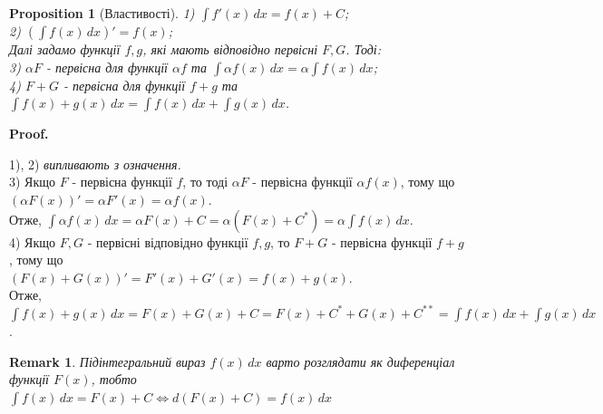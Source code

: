\documentclass[a4paper, 10pt]{article}
\makeatletter
\def\huge{\displaystyle}
\def\qed{$\blacksquare$}
\theoremstyle{theoremdd}
\theoremstyle{theoremdd}
\theoremstyle{theoremdd}
\theoremstyle{theoremdd}
\theoremstyle{theoremdd}
\newtheorem{proposition}[theorem]{Proposition}
\theoremstyle{theoremdd}
\newtheorem{remark}[theorem]{Remark}
\theoremstyle{theoremdd}
\theoremstyle{theoremdd}
\renewenvironment{proof}[1][Proof.\\]{\par
\pushQED{\hfill \qed}%
\normalfont \topsep6\p@\@plus6\p@\relax
\trivlist
\item\relax
{\bfseries
#1\@addpunct{.}}\hspace\labelsep\ignorespaces
}{%
\popQED\endtrivlist\@endpefalse
}
\makeatother
\begin{document}
\begin{proposition}[Властивості]
1) $\huge \int f'(x)\,dx = f(x) + C$;\\
2) $\huge \left(\int f(x)\,dx \right)' = f(x)$; \\
Далі задамо функції $f,g$, які мають відповідно первісні $F,G$. Тоді:\\
3) $\alpha F$ - первісна для функції $\alpha f$ та $\huge \int \alpha f(x)\,dx = \alpha \int f(x)\,dx$;\\
4) $F+G$ - первісна для функції $f+g$ та $\huge \int f(x) + g(x) \,dx = \int f(x)\,dx + \int g(x)\,dx$.
\end{proposition}

\begin{proof}
1), 2) \textit{випливають з означення.} \bigskip \\
3) Якщо $F$ - первісна функції $f$, то тоді $\alpha F$ - первісна функції $\alpha f(x)$, тому що \\ $(\alpha F(x))' = \alpha F'(x) = \alpha f(x)$. \\ Отже, $\huge\int \alpha f(x) \,dx = \alpha F(x) + C = \alpha \left( F(x) + C^* \right) = \alpha \int f(x)\,dx$. \bigskip \\
4) Якщо $F,G$ - первісні відповідно функції $f,g$, то $F+G$ - первісна функції $f+g$, тому що \\ $(F(x)+G(x))' = F'(x)+G'(x) = f(x)+g(x)$. \\ Отже, $\huge\int f(x)+g(x) \,dx = F(x) + G(x) + C = F(x) + C^* + G(x) + C^{**} = \int f(x)\,dx + \int g(x)\,dx$.
\end{proof}

\begin{remark}
Підінтегральний вираз $f(x)\,dx$ варто розглядати як диференціал функції $F(x)$, тобто\\
$\huge\int f(x)\,dx = F(x) + C \iff d(F(x)+C) = f(x)\,dx$
\end{remark}
\end{document}
